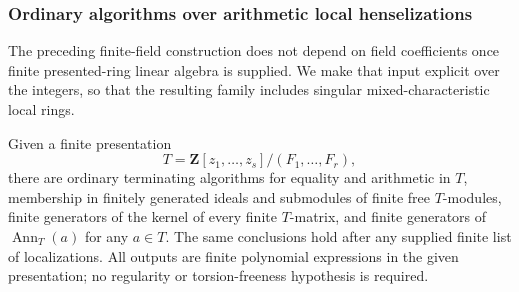 \subsubsection{Ordinary algorithms over arithmetic local henselizations}

The preceding finite-field construction does not depend on field coefficients
once finite presented-ring linear algebra is supplied.  We make that input
explicit over the integers, so that the resulting family includes singular
mixed-characteristic local rings.

\begin{lemma}
\label{C:integer-algebra-linear-algorithms}
Given a finite presentation
\[
 T=\mathbf Z[z_1,\ldots,z_s]/(F_1,\ldots,F_r),
\]
there are ordinary terminating algorithms for equality and arithmetic in
$T$, membership in finitely generated ideals and submodules of finite free
$T$-modules, finite generators of the kernel of every finite $T$-matrix,
and finite generators of $\operatorname{Ann}_T(a)$ for any $a\in T$.
The same conclusions hold after any supplied finite list of localizations.
All outputs are finite polynomial expressions in the given presentation;
no regularity or torsion-freeness hypothesis is required.
\end{lemma}
